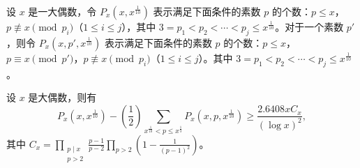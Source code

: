 设 $x$ 是一大偶数，令 $P_x(x,x^{\frac1{10}})$ 表示满足下面条件的素数 $p$ 的个数：$p\leqslant x$，$p\not\equiv x\pmod{p_i}$（$1\leqslant i\leqslant j$），其中 $3=p_1<p_2<\cdots<p_j\leqslant x^{\frac1{10}}$。对于一个素数 $p'$，则令 $P_x(x,p',x^{\frac1{10}})$ 表示满足下面条件的素数 $p$ 的个数：$p\leqslant x$，$p\equiv x\pmod{p'}$，$p\not\equiv x\pmod{p_i}$（$1\leqslant i\leqslant j$）。其中 $3=p_1<p_2<\cdots<p_j\leqslant x^{\frac1{10}}$。

\begin{lemma}
设 $x$ 是大偶数，则有
\[
P_x(x,x^{\frac1{10}})-\left(\frac12\right)\sum_{x^{\frac1{10}}<p\leqslant x^{\frac13}}P_x(x,p,x^{\frac1{10}})\geqslant\frac{2.6408xC_x}{(\log x)^2},
\]
其中 $C_x=\displaystyle\prod_{\substack{p\mid x\\p>2}}\frac{p-1}{p-2}\prod_{p>2}\left(1-\frac1{(p-1)^2}\right)$。
\end{lemma}

